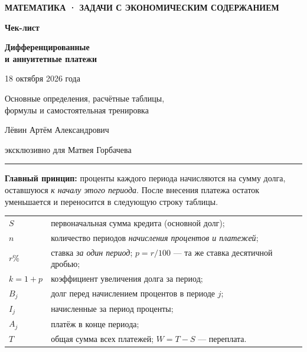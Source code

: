 \documentclass[a4paper,12pt]{article}
\newcommand{\Important}[1]{\textbf{#1}}
\newcommand{\secname}[1]{\vspace{4pt}{\Large\bfseries\color{darkaccent}#1}\par\vspace{5pt}\noindent\textcolor{hair}{\rule{\linewidth}{0.7pt}}\vspace{3pt}}
\begin{document}
\thispagestyle{empty}
\vspace*{27mm}
\begin{center}
{\small\bfseries\color{darkaccent} МАТЕМАТИКА · ЗАДАЧИ С ЭКОНОМИЧЕСКИМ СОДЕРЖАНИЕМ}\par
\vspace{22mm}
{\fontsize{31}{37}\selectfont\bfseries\color{darkaccent} Чек-лист}\par
\vspace{9mm}
{\fontsize{23}{30}\selectfont\bfseries Дифференцированные\\[2mm] и аннуитетные платежи}\par
\vspace{14mm}
{\large 18 октября 2026 года}\par
\vspace{21mm}
{\normalsize Основные определения, расчётные таблицы,\\ формулы и самостоятельная тренировка}\par
\vfill
{\normalsize\color{darkaccent} Лёвин Артём Александрович}\par
\vspace{2mm}
{\normalsize эксклюзивно для Матвея Горбачева}\par
\end{center}
\vspace{18mm}
\clearpage

\secname{1. Общая модель кредита}
\Important{Главный принцип:} проценты каждого периода начисляются на сумму долга, оставшуюся \emph{к началу этого периода}. После внесения платежа остаток уменьшается и переносится в следующую строку таблицы.

\begin{tabularx}{\linewidth}{@{}>{\bfseries}p{18mm}X@{}}
\toprule
$S$ & первоначальная сумма кредита (основной долг);\\
$n$ & количество периодов \emph{начисления процентов и платежей};\\
$r\%$ & ставка \emph{за один период}; $p=r/100$ — та же ставка десятичной дробью;\\
$k=1+p$ & коэффициент увеличения долга за период;\\
$B_j$ & долг перед начислением процентов в периоде $j$;\\
$I_j$ & начисленные за период проценты;\\
$A_j$ & платёж в конце периода;\\
$T$ & общая сумма всех платежей; $W=T-S$ — переплата.\\
\bottomrule
\end{tabularx}
\end{document}
